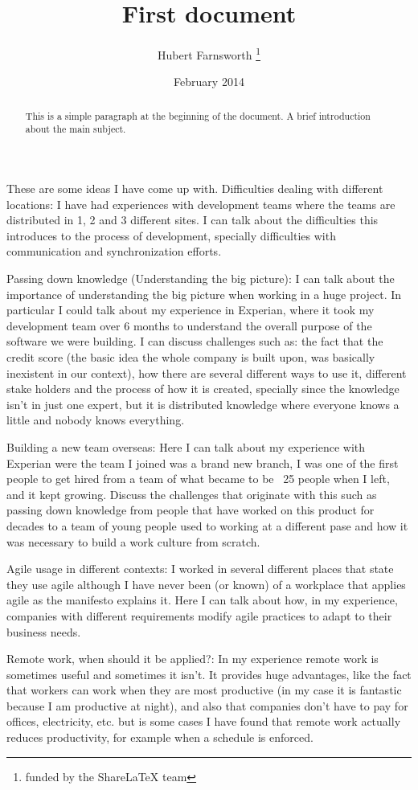 \documentclass[12pt, letterpaper, twoside]{article}
\title{First document}
\author{Hubert Farnsworth \thanks{funded by the ShareLaTeX team}}
\date{February 2014}
\begin{document}
 
\begin{titlepage}
\maketitle
\end{titlepage}

\begin{abstract}
This is a simple paragraph at the beginning of the 
document. A brief introduction about the main subject.
\end{abstract}
 
These are some ideas I have come up with.
Difficulties dealing with different locations: I have had experiences with development teams where the teams are distributed in 1, 2 and 3 different sites. I can talk about the difficulties this introduces to the process of development, specially difficulties with communication and synchronization efforts.

Passing down knowledge (Understanding the big picture): I can talk about the importance of understanding the big picture when working in a huge project. In particular I could talk about my experience in Experian, where it took my development team over 6 months to understand the overall purpose of the software we were building. I can discuss challenges such as: the fact that the credit score (the basic idea the whole company is built upon, was basically inexistent in our context), how there are several different ways to use it, different stake holders and the process of how it is created, specially since the knowledge isn't in just one expert, but it is distributed knowledge where everyone knows a little and nobody knows everything.

Building a new team overseas: Here I can talk about my experience with Experian were the team I joined was a brand new branch, I was one of the first people to get hired from a team of what became to be ~25 people when I left, and it kept growing. Discuss the challenges that originate with this such as passing down knowledge from people that have worked on this product for decades to a team of young people used to working at a different pase and how it was necessary to build a work culture from scratch.

Agile usage in different contexts: I worked in several different places that state they use agile although I have never been (or known) of a  workplace that applies agile as the manifesto explains it. Here I can talk about how, in my experience, companies with different requirements modify agile practices to adapt to their business needs.

Remote work, when should it be applied?: In my experience remote work is sometimes useful and sometimes it isn't. It provides huge advantages, like the fact that workers can work when they are most productive (in my case it is fantastic because I am productive at night), and also that companies don't have to pay for offices, electricity, etc. but is some cases I have found that remote work actually reduces productivity, for example when a schedule is enforced.
 
\end{document}
